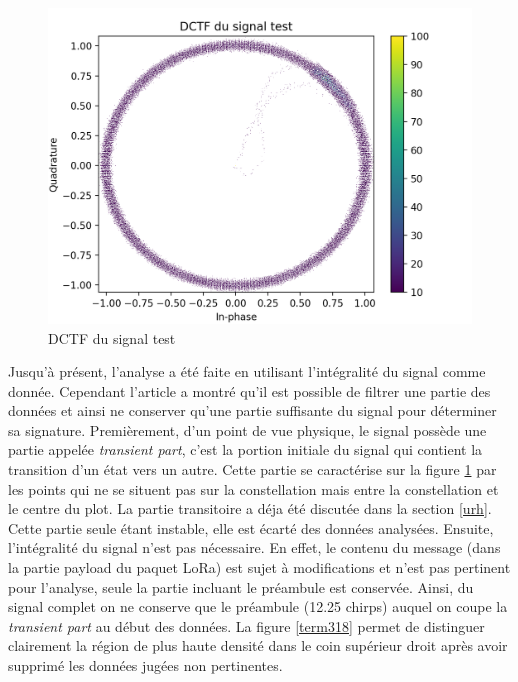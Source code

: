 \begin{figure}[h]
\centering

\includegraphics[scale=0.3]{images/dctf4.png}
\caption{DCTF du signal test}\label{term317}
\end{figure}

Jusqu'à présent, l'analyse a été faite en utilisant l'intégralité du signal comme donnée. Cependant l'article \cite{loraDCTF} a montré qu'il est possible de filtrer une partie des données et ainsi ne conserver qu'une partie suffisante du signal pour déterminer sa signature. Premièrement, d'un point de vue physique, le signal possède une partie appelée \textit{transient part}, c'est la portion initiale du signal qui contient la transition d'un état vers un autre. Cette partie se caractérise sur la figure \ref{term317} par les points qui ne se situent pas sur la constellation mais entre la constellation et le centre du plot. La partie transitoire a déja été discutée dans la section \ref{urh}. Cette partie seule étant instable, elle est écarté des données analysées. Ensuite, l'intégralité du signal n'est pas nécessaire. En effet, le contenu du message (dans la partie payload du paquet LoRa) est sujet à modifications et n'est pas pertinent pour l'analyse, seule la partie incluant le préambule est conservée. Ainsi, du signal complet on ne conserve que le préambule (12.25 chirps) auquel on coupe la \textit{transient part} au début des données. La figure \ref{term318} permet de distinguer clairement la région de plus haute densité dans le coin supérieur droit après avoir supprimé les données jugées non pertinentes.

